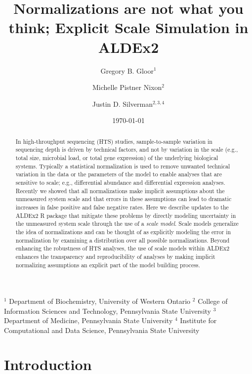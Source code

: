 \documentclass[
]{article}
\title{Normalizations are not what you think; Explicit Scale Simulation
in ALDEx2}
\author{Gregory B. Gloor$^1$ \and Michelle Pistner Nixon$^2$ \and Justin D. Silverman$^{2,3,4}$}
\date{\today}
\begin{document}
\maketitle

$^1$ Department of Biochemistry, University of Western Ontario
$^2$ College of Information Sciences and Technology, Pennsylvania  State University
$^3$ Department of Medicine, Pennsylvania  State University
$^4$ Institute for Computational and Data Science, Pennsylvania State University

\begin{abstract}
In high-throughput sequencing (HTS) studies, sample-to-sample variation
in sequencing depth is driven by technical factors, and not by variation
in the scale (e.g., total size, microbial load, or total gene
expression) of the underlying biological systems. Typically a
statistical normalization is used to remove unwanted technical variation
in the data or the parameters of the model to enable analyses that are
sensitive to scale; e.g., differential abundance and differential
expression analyses. Recently we showed that all normalizations make
implicit assumptions about the unmeasured system scale and that errors
in these assumptions can lead to dramatic increases in false positive
and false negative rates. Here we describe updates to the ALDEx2 R
package that mitigate these problems by directly modeling uncertainty in
the unmeasured system scale through the use of a \textit{scale model}.
Scale models generalize the idea of normalizations and can be thought of
as explicitly modeling the error in normalization by examining a
distribution over all possible normalizations. Beyond enhancing the
robustness of HTS analyses, the use of scale models within ALDEx2
enhances the transparency and reproducibility of analyses by making
implicit normalizing assumptions an explicit part of the model building
process.
\end{abstract}

\section{Introduction}\label{introduction}
\end{document}

